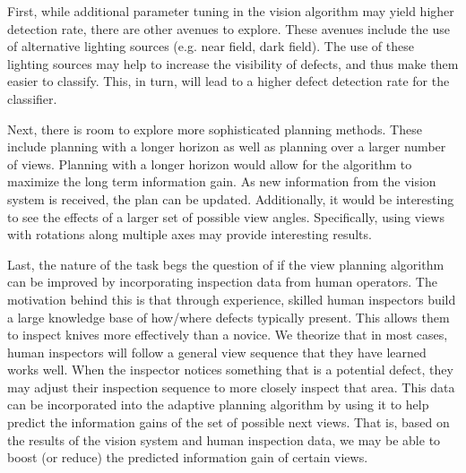 \documentclass[letterpaper, 10 pt, conference]{ieeeconf}  %
\begin{document}
First, while additional parameter tuning in the vision algorithm may yield higher detection rate, there are other avenues to explore. These avenues include the use of alternative lighting sources (e.g. near field, dark field). The use of these lighting sources may help to increase the visibility of defects, and thus make them easier to classify. This, in turn, will lead to a higher defect detection rate for the classifier.

Next, there is room to explore more sophisticated planning methods. These include planning with a longer horizon as well as planning over a larger number of views. Planning with a longer horizon would allow for the algorithm to maximize the long term information gain. As new information from the vision system is received, the plan can be updated. Additionally, it would be interesting to see the effects of a larger set of possible view angles. Specifically, using views with rotations along multiple axes may provide interesting results.

Last, the nature of the task begs the question of if the view planning algorithm can be improved by incorporating inspection data from human operators. The motivation behind this is that through experience, skilled human inspectors build a large knowledge base of how/where defects typically present. This allows them to inspect knives more effectively than a novice. We theorize that in most cases, human inspectors will follow a general view sequence that they have learned works well. When the inspector notices something that is a potential defect, they may adjust their inspection sequence to more closely inspect that area. This data can be incorporated into the adaptive planning algorithm by using it to help predict the information gains of the set of possible next views. That is, based on the results of the vision system and human inspection data, we may be able to boost (or reduce) the predicted information gain of certain views.



\end{document}
